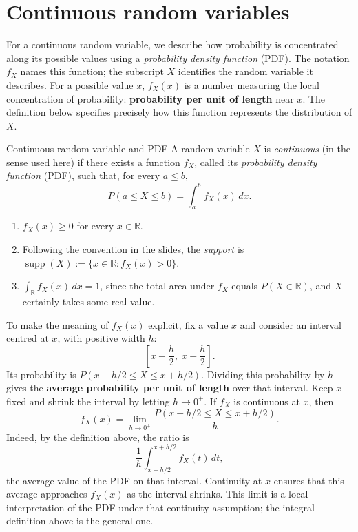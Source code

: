 \documentclass[a4paper,12pt,oneside]{report}
\begin{document}
\clearpage
\section{Continuous random variables}

For a continuous random variable, we describe how probability is
concentrated along its possible values using a \emph{probability
density function} (PDF). The notation $f_X$ names this function;
the subscript $X$ identifies the random variable it describes.
For a possible value $x$, $f_X(x)$ is a number measuring the local
concentration of probability: \textbf{probability per unit of length}
near $x$. The definition below specifies precisely how this function
represents the distribution of $X$.

\begin{frameddefn}{Continuous random variable and PDF}
\label{def:continuous-pdf}
A random variable $X$ is \emph{continuous} (in the sense used here)
if there exists a function $f_X$, called its \emph{probability density
function} (PDF), such that, for every $a\leq b$,
\[
  P(a\leq X\leq b)=\int_a^b f_X(x)\,dx.
\]
\begin{enumerate}
  \item $f_X(x)\geq0$ for every $x\in\mathbb R$.
  \item Following the convention in the slides, the \emph{support} is
    $\operatorname{supp}(X):=\{x\in\mathbb R:f_X(x)>0\}$.
  \item $\displaystyle\int_{\mathbb R}f_X(x)\,dx=1$, since the total
    area under $f_X$ equals $P(X\in\mathbb R)$, and $X$ certainly
    takes some real value.
\end{enumerate}
\end{frameddefn}

To make the meaning of $f_X(x)$ explicit, fix a value $x$ and
consider an interval centred at $x$, with positive width $h$:
\[
  \left[x-\frac h2,\;x+\frac h2\right].
\]
Its probability is $P(x-h/2\leq X\leq x+h/2)$. Dividing this
probability by $h$ gives the \textbf{average probability per unit
of length} over that interval. Keep $x$ fixed and shrink the
interval by letting $h\to0^+$. If $f_X$ is continuous at $x$, then
\[
  \boxed{
    f_X(x)=\lim_{h\to0^+}
    \frac{P(x-h/2\leq X\leq x+h/2)}{h}.
  }
\]
Indeed, by the definition above, the ratio is
\[
  \frac{1}{h}\int_{x-h/2}^{x+h/2}f_X(t)\,dt,
\]
the average value of the PDF on that interval. Continuity at $x$
ensures that this average approaches $f_X(x)$ as the interval
shrinks. This limit is a local interpretation of the PDF under
that continuity assumption; the integral definition above is the
general one.
\end{document}
